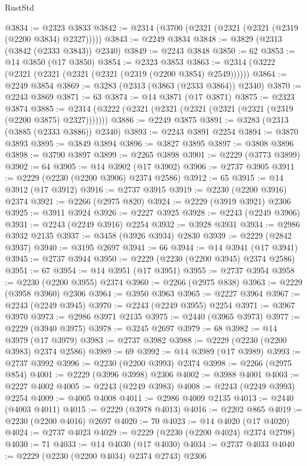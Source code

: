\begin{lexlean}{RustStd}
\begin{coremodule}
@3834 := @2323 @3833
@3842 := @2314 (@3700 (@2321 (@2321 (@2321 (@2319 (@2200 @3834) @2327)))))
@3843 := @2249 @3834
@3848 := @3829 (@2313 (@3842 (@2333 @3843)) @2340)
@3849 := @2243 @3848
@3850 := 62
@3853 := @14 @3850 (@17 @3850)
@3854 := @2323 @3853
@3863 := @2314 (@3222 (@2321 (@2321 (@2321 (@2321 (@2319 (@2200 @3854) @2549))))))
@3864 := @2249 @3854
@3869 := @3283 (@2313 (@3863 (@2333 @3864)) @2340)
@3870 := @2243 @3869
@3871 := 63
@3874 := @14 @3871 (@17 @3871)
@3875 := @2323 @3874
@3885 := @2314 (@3222 (@2321 (@2321 (@2321 (@2321 (@2321 (@2319 (@2200 @3875) @2327)))))))
@3886 := @2249 @3875
@3891 := @3283 (@2313 (@3885 (@2333 @3886)) @2340)
@3893 := @2243 @3891 @2254
@3894 := @3870 @3893
@3895 := @3849 @3894
@3896 := @3827 @3895
@3897 := @3808 @3896
@3898 := @3790 @3897
@3899 := @2265 @3898
@3901 := @2229 (@3773 @3899)
@3902 := 64
@3905 := @14 @3902 (@17 @3902)
@3906 := @2737 @3905
@3911 := @2229 (@2230 (@2200 @3906) @2374 @2586)
@3912 := 65
@3915 := @14 @3912 (@17 @3912)
@3916 := @2737 @3915
@3919 := @2230 (@2200 @3916) @2374
@3921 := @2266 (@2975 @820)
@3924 := @2229 (@3919 @3921) @2306
@3925 := @3911 @3924
@3926 := @2227 @3925
@3928 := @2243 (@2249 @3906)
@3931 := @2243 (@2249 @3916) @2254
@3932 := @3928 @3931
@3934 := @2986 @3932 @2135
@3937 := @3458 (@3926 @3934) @2830
@3939 := @2229 (@2842 @3937)
@3940 := @3195 @2697
@3941 := 66
@3944 := @14 @3941 (@17 @3941)
@3945 := @2737 @3944
@3950 := @2229 (@2230 (@2200 @3945) @2374 @2586)
@3951 := 67
@3954 := @14 @3951 (@17 @3951)
@3955 := @2737 @3954
@3958 := @2230 (@2200 @3955) @2374
@3960 := @2266 (@2975 @838)
@3963 := @2229 (@3958 @3960) @2306
@3964 := @3950 @3963
@3965 := @2227 @3964
@3967 := @2243 (@2249 @3945)
@3970 := @2243 (@2249 @3955) @2254
@3971 := @3967 @3970
@3973 := @2986 @3971 @2135
@3975 := @2440 (@3965 @3973)
@3977 := @2229 (@3940 @3975)
@3978 := @3245 @2697
@3979 := 68
@3982 := @14 @3979 (@17 @3979)
@3983 := @2737 @3982
@3988 := @2229 (@2230 (@2200 @3983) @2374 @2586)
@3989 := 69
@3992 := @14 @3989 (@17 @3989)
@3993 := @2737 @3992
@3996 := @2230 (@2200 @3993) @2374
@3998 := @2266 (@2975 @854)
@4001 := @2229 (@3996 @3998) @2306
@4002 := @3988 @4001
@4003 := @2227 @4002
@4005 := @2243 (@2249 @3983)
@4008 := @2243 (@2249 @3993) @2254
@4009 := @4005 @4008
@4011 := @2986 @4009 @2135
@4013 := @2440 (@4003 @4011)
@4015 := @2229 (@3978 @4013)
@4016 := @2202 @865
@4019 := @2230 (@2200 @4016) @2697
@4020 := 70
@4023 := @14 @4020 (@17 @4020)
@4024 := @2737 @4023
@4029 := @2229 (@2230 (@2200 @4024) @2374 @2798)
@4030 := 71
@4033 := @14 @4030 (@17 @4030)
@4034 := @2737 @4033
@4040 := @2229 (@2230 (@2200 @4034) @2374 @2743) @2306

\end{coremodule}
\end{lexlean}
